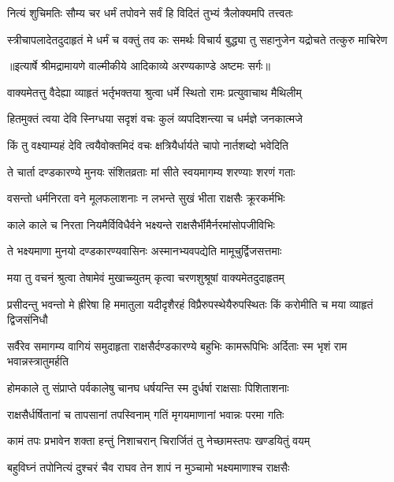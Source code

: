 \twolineshloka
{नित्यं शुचिमतिः सौम्य चर धर्मं तपोवने}
{सर्वं हि विदितं तुभ्यं त्रैलोक्यमपि तत्त्वतः} %

\fourlineindentedshloka
{स्त्रीचापलादेतदुदाहृतं मे}
{ धर्मं च वक्तुं तव कः समर्थः}
{विचार्य बुद्ध्या तु सहानुजेन}
{ यद्रोचते तत्कुरु माचिरेण} %


{॥इत्यार्षे श्रीमद्रामायणे वाल्मीकीये आदिकाव्ये अरण्यकाण्डे अष्टमः सर्गः॥}


\twolineshloka
{वाक्यमेतत्तु वैदेह्या व्याहृतं भर्तृभक्तया}
{श्रुत्वा धर्मे स्थितो रामः प्रत्युवाचाथ मैथिलीम्} %

\twolineshloka
{हितमुक्तं त्वया देवि स्निग्धया सदृशं वचः}
{कुलं व्यपदिशन्त्या च धर्मज्ञे जनकात्मजे} %

\twolineshloka
{किं तु वक्ष्याम्यहं देवि त्वयैवोक्तमिदं वचः}
{क्षत्रियैर्धार्यते चापो नार्तशब्दो भवेदिति} %

\twolineshloka
{ते चार्ता दण्डकारण्ये मुनयः संशितव्रताः}
{मां सीते स्वयमागम्य शरण्याः शरणं गताः} %

\twolineshloka
{वसन्तो धर्मनिरता वने मूलफलाशनाः}
{न लभन्ते सुखं भीता राक्षसैः क्रूरकर्मभिः} %

\twolineshloka
{काले काले च निरता नियमैर्विविधैर्वने}
{भक्ष्यन्ते राक्षसैर्भीमैर्नरमांसोपजीविभिः} %

\twolineshloka
{ते भक्ष्यमाणा मुनयो दण्डकारण्यवासिनः}
{अस्मानभ्यवपद्येति मामूचुर्द्विजसत्तमाः} %

\twolineshloka
{मया तु वचनं श्रुत्वा तेषामेवं मुखाच्च्युतम्}
{कृत्वा चरणशुश्रूषां वाक्यमेतदुदाहृतम्} %

\threelineshloka
{प्रसीदन्तु भवन्तो मे ह्रीरेषा हि ममातुला}
{यदीदृशैरहं विप्रैरुपस्थेयैरुपस्थितः}
{किं करोमीति च मया व्याहृतं द्विजसंनिधौ} %

\threelineshloka
{सर्वैरेव समागम्य वागियं समुदाहृता}
{राक्षसैर्दण्डकारण्ये बहुभिः कामरूपिभिः}
{अर्दिताः स्म भृशं राम भवान्नस्त्रातुमर्हति} %

\twolineshloka
{होमकाले तु संप्राप्ते पर्वकालेषु चानघ}
{धर्षयन्ति स्म दुर्धर्षा राक्षसाः पिशिताशनाः} %

\twolineshloka
{राक्षसैर्धर्षितानां च तापसानां तपस्विनाम्}
{गतिं मृगयमाणानां भवान्नः परमा गतिः} %

\twolineshloka
{कामं तपः प्रभावेन शक्ता हन्तुं निशाचरान्}
{चिरार्जितं तु नेच्छामस्तपः खण्डयितुं वयम्} %

\twolineshloka
{बहुविघ्नं तपोनित्यं दुश्चरं चैव राघव}
{तेन शापं न मुञ्चामो भक्ष्यमाणाश्च राक्षसैः} %

